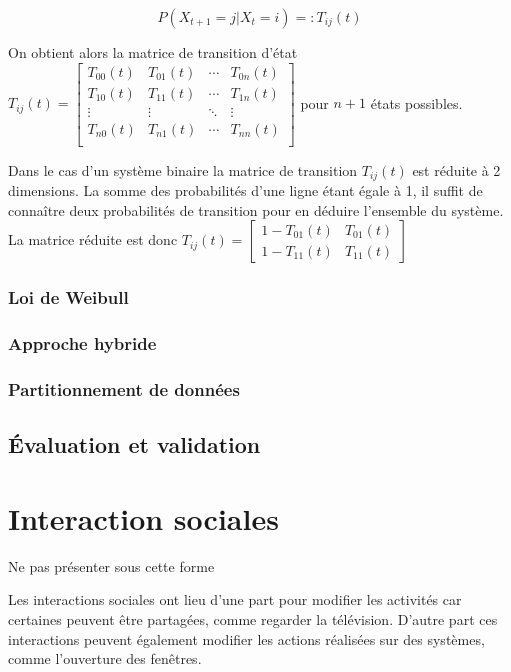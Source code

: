 \begin{equation}
P(X_{t+1}=j|X_{t}=i)=:T_{ij}(t)
\end{equation}

On obtient alors la matrice de transition d'état $ T_{ij}(t)= \begin{bmatrix}
        T_{00}(t) & T_{01}(t) & \cdots & T_{0n}(t)\\
        T_{10}(t) & T_{11}(t) & \cdots & T_{1n}(t)\\
        \vdots & \vdots & \ddots & \vdots\\
        T_{n0}(t) & T_{n1}(t) & \cdots & T_{nn}(t)\\
     \end{bmatrix}$ pour $n+1$ états possibles.
     
Dans le cas d'un système binaire la matrice de transition $ T_{ij}(t)$ est réduite à 2 dimensions. La somme des probabilités d'une ligne étant égale à 1, il suffit de connaître deux probabilités de transition pour en déduire l'ensemble du système. La matrice réduite est donc $T_{ij}(t)= \begin{bmatrix}
        1-T_{01}(t) & T_{01}(t)\\
        1-T_{11}(t) & T_{11}(t)       
     \end{bmatrix}$

\subsubsection{Loi de Weibull}

\subsubsection{Approche hybride}

\subsubsection{Partitionnement de données}

\subsection{Évaluation et validation}


\section{Interaction sociales}
Ne pas présenter sous cette forme

Les interactions sociales ont lieu d'une part pour modifier les activités car certaines peuvent être partagées, comme regarder la télévision. D'autre part ces interactions peuvent également modifier les actions réalisées sur des systèmes, comme l'ouverture des fenêtres.

